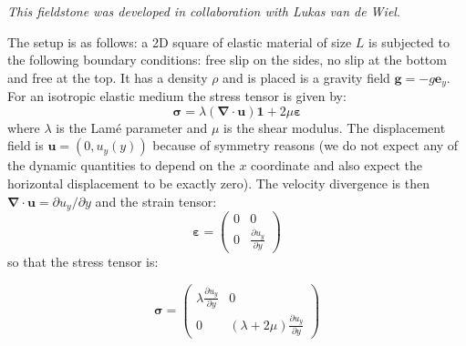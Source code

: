{\sl This fieldstone was developed in collaboration with Lukas van de Wiel}.

The setup is as follows: a 2D square of elastic material of size $L$ is 
subjected to the following boundary conditions: free slip on the sides, no slip at the 
bottom and free at the top. It has a density $\rho$ and is placed is a gravity 
field ${\bm g}=-g {\bm e}_y$.
For an isotropic elastic medium the stress tensor is given by:
\[
{\bm \sigma} = \lambda ({\bm \nabla}\cdot{\bm u}) {\bm 1} + 2 \mu {\bm \varepsilon}
\]
where $\lambda$ is the Lam{\'e} parameter and $\mu$ is the shear modulus.
The displacement field is ${\bm u}=(0,u_y(y))$ because of symmetry reasons 
(we do not expect any of the dynamic quantities to depend on the $x$ coordinate and 
also expect the horizontal displacement to be exactly zero).
The velocity divergence is then ${\bm \nabla}\cdot{\bm u} = \partial u_y/\partial y$
and the strain tensor:
\[
{\bm \varepsilon}
=
\left(
\begin{array}{cc}
0 & 0 \\
0 & \frac{\partial u_y}{\partial y}
\end{array}
\right)
\]
so that the stress tensor is:

\[
{\bm \sigma} =
\left(
\begin{array}{cc}
\lambda \frac{\partial u_y}{\partial y} &  0 \\
0 & (\lambda + 2 \mu) \frac{\partial u_y}{\partial y}
\end{array}
\right)
\]

